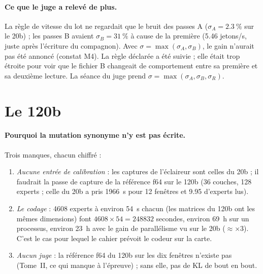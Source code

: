 \paragraph{Ce que le juge a relevé de plus.} La règle de vitesse du lot ne regardait que le bruit des passes A ($\sigma_A = \SI{2.3}{\percent}$ sur le 20b) ; les passes B avaient $\sigma_B = \SI{31}{\percent}$ à cause de la première (\num{5.46} jetons/s, juste après l'écriture du compagnon). Avec $\sigma = \max(\sigma_A, \sigma_B)$, le gain n'aurait pas été annoncé (constat M4). La règle déclarée a été suivie ; elle était trop étroite pour voir que le fichier B changeait de comportement entre sa première et sa deuxième lecture. La séance du juge prend $\sigma = \max(\sigma_A, \sigma_B, \sigma_R)$.

\section{Le 120b}\label{t3sno:sec:120b}

\paragraph{Pourquoi la mutation synonyme n'y est pas écrite.} Trois manques, chacun chiffré \calc :
\begin{enumerate}
\item \emph{Aucune entrée de calibration} : les captures de l'éclaireur sont celles du 20b ; il faudrait la passe de capture de la référence f64 sur le 120b (36 couches, 128 experts ; celle du 20b a pris \SI{1966}{\second} pour 12 fenêtres et \SI{9.95}{\Go} d'experts lus).
\item \emph{Le codage} : \num{4608} experts à environ \SI{54}{\second} chacun (les matrices du 120b ont les mêmes dimensions) font $\num{4608} \times 54 = \num{248832}$ secondes, environ \SI{69}{\hour} sur un processus, environ \SI{23}{\hour} avec le gain de parallélisme vu sur le 20b ($\approx \times 3$). C'est le cas pour lequel le cahier prévoit le codeur sur la carte.
\item \emph{Aucun juge} : la référence f64 du 120b sur les dix fenêtres n'existe pas (Tome~II, ce qui manque à l'épreuve) ; sans elle, pas de KL de bout en bout.
\end{enumerate}

